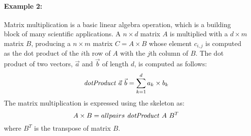 \paragraph{Example 2:}
Matrix multiplication is a basic linear algebra operation, which is a building block of many scientific applications.
A $n\times d$ matrix $A$ is multiplied with a $d\times m$ matrix $B$, producing a $n\times m$ matrix $C=A\times B$ whose element $c_{i,j}$ is computed as the dot product of the $i$th row of $A$ with the $j$th column of $B$.
The dot product of two vectors, $\vec{a}$ and $\vec{b}$ of length $d$, is computed as follows:
\begin{equation}
  \dotProduct\ \vec{a}\ \vec{b} = \sum_{k=1}^d a_k \times b_k
\end{equation}
The matrix multiplication is expressed using the \allpairs skeleton as:
\begin{equation}
  A\times B = allpairs\ \mbox{\emph{dotProduct}}\ A\ B^T
  \label{eq:mat_mult_allpairs}
\end{equation}
where $B^T$ is the transpose of matrix $B$.

% 



